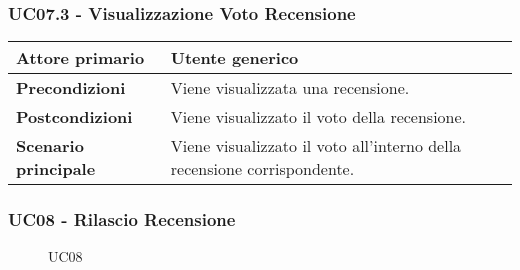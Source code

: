         \subsubsection{UC07.3 - Visualizzazione Voto Recensione}
        \label{UC07.3}

            \begin{center}
                \renewcommand{\arraystretch}{1.5}
                \begin{tabular}{m{10em} m{20em}}
                    \hline
                    \textbf{Attore primario} & Utente generico \\
                    \hline
                    \textbf{Precondizioni} & Viene visualizzata una recensione. \\
                    \hline
                    \textbf{Postcondizioni} & Viene visualizzato il voto della recensione. \\
                    \hline
                    \textbf{Scenario principale} & Viene visualizzato il voto all'interno della recensione corrispondente. \\
                    \hline
                \end{tabular}
            \end{center}

        \subsubsection{UC08 - Rilascio Recensione}
        \label{UC08}

            \begin{figure}[H]
                \centering
                
                \caption{UC08}
            \end{figure}

